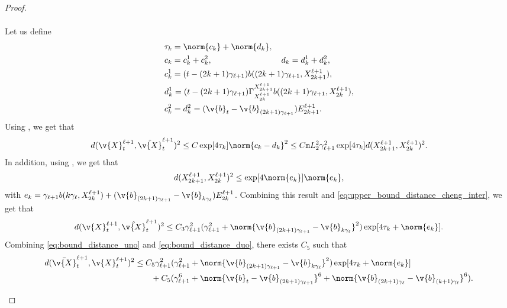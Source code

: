 \begin{proof}{}{}
\begin{enumerate}[wide, labelindent=0pt, label=(\alph*)]
\begin{align}
		      \end{align}
		      Let us define \begin{align}  & \tau_k = \norm{c_k} + \norm{d_k} , \\ &c_k = c_k^1 + c_k^2 , \qquad \qquad \qquad \qquad \ d_k = d_k^1 + d_k^2 ,\\ &c_k^1 = (t - (2k+1)\gamma_{\ell+1}) b((2k+1) \gamma_{\ell+1}, X_{2k+1}^{\ell+1}) , \\ &d_k^1 = (t - (2k+1)\gamma_{\ell+1}) \Gamma_{X_{2k}^{\ell+1}}^{X_{2k+1}^{\ell+1}}b((2k+1) \gamma_{\ell+1}, X_{2k}^{\ell+1}) , \\  & c_k^2 = d_k^2 = (\v{b}_{t} - \v{b}_{(2k+1) \gamma_{\ell+1}}) E_{2k+1}^{\ell+1} .
                 \label{eq:def_tau}
		      \end{align}
		      Using , we get that \begin{align} \label{eq:upper_bound_distance_cheng_inter} d(\v{X}_{t}^{\ell+1}, \hat{\v{X}}_{t}^{\ell+1})^2 \leq C \exp[4 \tau_k] \norm{c_k - d_k}^2 \leq C \mathtt{m}{L}_2^2 \gamma_{\ell+1}^2 \exp[4 \tau_k] d(X_{2k+1}^{\ell+1}, X_{2k}^{\ell+1})^2 .
		      \end{align}
		      In addition, using , we get that \begin{equation} d(X_{2k+1}^{\ell+1}, X_{2k}^{\ell+1})^2 \leq \exp[4 \norm{e_k}] \norm{e_k} , \end{equation} with \(e_k = \gamma_{\ell+1}b(k\gamma_\ell, X_{2k}^{\ell+1}) + (\v{b}_{(2k+1)\gamma_{\ell+1}} - \v{b}_{k\gamma_{\ell}}) E_{2k}^{\ell+1}\).
		      Combining this result and \eqref{eq:upper_bound_distance_cheng_inter}, we get that \begin{equation} \label{eq:bound_distance_duo} d(\v{X}_{t}^{\ell+1}, \hat{\v{X}}_{t}^{\ell+1})^2 \leq C_3 \gamma_{\ell+1}^2 (\gamma_{\ell+1}^2 + \norm{\v{b}_{(2k+1)\gamma_{\ell+1}} - \v{b}_{k\gamma_{\ell}}}^2)\exp[4 \tau_k + \norm{e_k}] .
		      \end{equation}
		      Combining \eqref{eq:bound_distance_uno} and \eqref{eq:bound_distance_duo}, there exists \(C_5\) such that \begin{align} d(\bar{\v{X}}_{t}^{\ell+1}, \v{X}_{t}^{\ell+1})^2 & \leq C_5 \gamma_{\ell+1}^2 (\gamma_{\ell+1}^2 + \norm{\v{b}_{(2k+1)\gamma_{\ell+1}} - \v{b}_{k\gamma_{\ell}}}^2)\exp[4 \tau_k + \norm{e_k}] \\  & \qquad + C_5 (\gamma_{\ell+1}^6 + \norm{\v{b}_{t} - \v{b}_{(2k+1) \gamma_{\ell+1}}}^6 + \norm{\v{b}_{(2k+1) \gamma_{\ell}} - \v{b}_{(k+1) \gamma_{\ell}}}^6) .
                 \label{eq:case_complete_2}
		      \end{align}


\end{enumerate}
\end{proof}
